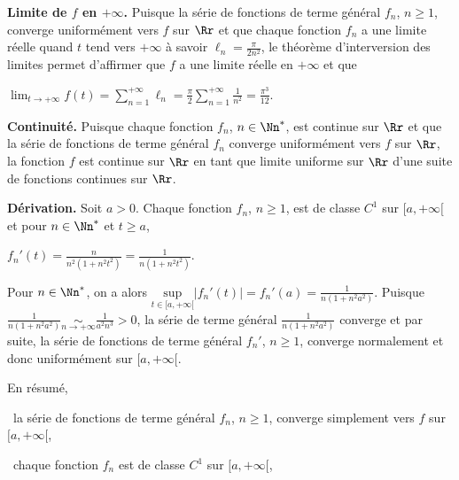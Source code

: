 {{\textbf{Limite de $f$ en $+\infty$.} Puisque la série de fonctions de terme général $f_n$, $n\geqslant1$, converge uniformément vers $f$ sur $\Rr$ et que chaque fonction $f_n$ a une limite réelle quand $t$ tend vers $+\infty$ à savoir $\ell_n=\frac{\pi}{2n^2}$, le théorème d'interversion des limites permet d'affirmer que $f$ a une limite réelle en $+\infty$ et que

\begin{center}
$\lim_{t \rightarrow +\infty}f(t)=\sum_{n=1}^{+\infty}\ell_n=\frac{\pi}{2}\sum_{n=1}^{+\infty}\frac{1}{n^2}=\frac{\pi^3}{12}$.
\end{center}

\begin{center}
\end{center}

\textbf{Continuité.} Puisque chaque fonction $f_n$, $n\in\Nn^*$, est continue sur $\Rr$ et que la série de fonctions de terme général $f_n$ converge uniformément vers $f$ sur $\Rr$, la fonction $f$ est continue sur $\Rr$ en tant que limite uniforme sur $\Rr$ d'une suite de fonctions continues sur $\Rr$.

\begin{center}
\end{center}

\textbf{Dérivation.} Soit $a>0$. Chaque fonction $f_n$, $n\geqslant1$, est de classe $C^1$ sur $[a,+\infty[$ et pour $n\in\Nn^*$ et $t\geqslant a$,

\begin{center}
$f_n'(t)=\frac{n}{n^2(1+n^2t^2)}=\frac{1}{n(1+n^2t^2)}$.
\end{center}

Pour $n\in\Nn^*$, on a alors $\underset{t\in[a,+\infty[}{\text{sup}}|f_n'(t)|=f_n'(a)=\frac{1}{n(1+n^2a^2)}$. Puisque $\frac{1}{n(1+n^2a^2)}\underset{n\rightarrow+\infty}{\sim}\frac{1}{a^2n^3}>0$, la série de terme général $\frac{1}{n(1+n^2a^2)}$ converge et par suite, la série de fonctions de terme général $f_n'$, $n\geqslant1$, converge normalement et donc uniformément sur $[a,+\infty[$.

En résumé,

\textbullet~la série de fonctions de terme général $f_n$, $n\geqslant 1$, converge simplement vers $f$ sur $[a,+\infty[$,

\textbullet~chaque fonction $f_n$ est de classe $C^1$ sur $[a,+\infty[$,

}}
